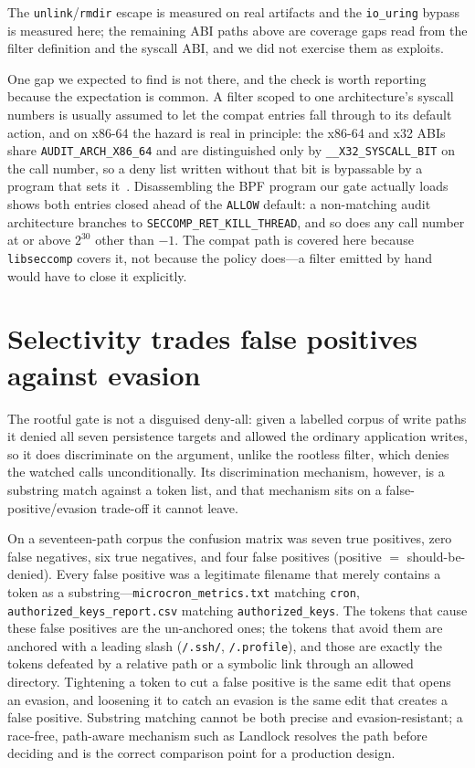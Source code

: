 \documentclass[11pt]{article}
\begin{document}
The \texttt{unlink}/\texttt{rmdir} escape is measured on real artifacts and the \texttt{io\_uring}
bypass is measured here; the remaining ABI paths above are coverage gaps read from the filter
definition and the syscall ABI, and we did not exercise them as exploits.

One gap we expected to find is not there, and the check is worth reporting because the expectation is
common. A filter scoped to one architecture's syscall numbers is usually assumed to let the compat
entries fall through to its default action, and on x86-64 the hazard is real in principle: the x86-64
and x32 ABIs share \texttt{AUDIT\_ARCH\_X86\_64} and are distinguished only by
\texttt{\_\_X32\_SYSCALL\_BIT} on the call number, so a deny list written without that bit is
bypassable by a program that sets it~\cite{seccompman}. Disassembling the BPF program our gate
actually loads shows both entries closed ahead of the \texttt{ALLOW} default: a non-matching audit
architecture branches to \texttt{SECCOMP\_RET\_KILL\_THREAD}, and so does any call number at or above
$2^{30}$ other than $-1$. The compat path is covered here because \texttt{libseccomp} covers it, not
because the policy does---a filter emitted by hand would have to close it explicitly.

\section{Selectivity trades false positives against evasion}\label{sec:selectivity}

The rootful gate is not a disguised deny-all: given a labelled corpus of write paths it denied all
seven persistence targets and allowed the ordinary application writes, so it does discriminate on the
argument, unlike the rootless filter, which denies the watched calls unconditionally. Its
discrimination mechanism, however, is a substring match against a token list, and that mechanism sits
on a false-positive/evasion trade-off it cannot leave.

On a seventeen-path corpus the confusion matrix was seven true positives, zero false negatives, six
true negatives, and four false positives (positive $=$ should-be-denied). Every false positive was a
legitimate filename that merely contains a token as a substring---\texttt{microcron\_metrics.txt}
matching \texttt{cron}, \texttt{authorized\_keys\_report.csv} matching \texttt{authorized\_keys}. The
tokens that cause these false positives are the un-anchored ones; the tokens that avoid them are anchored
with a leading slash (\texttt{/.ssh/}, \texttt{/.profile}), and those are exactly the tokens defeated by a
relative path or a symbolic link through an allowed directory. Tightening a token to cut a false positive
is the same edit that opens an evasion, and loosening it to catch an evasion is the same edit that creates
a false positive. Substring matching cannot be both precise and evasion-resistant; a race-free, path-aware
mechanism such as Landlock resolves the path before deciding and is the correct comparison point for a
production design.
\end{document}
